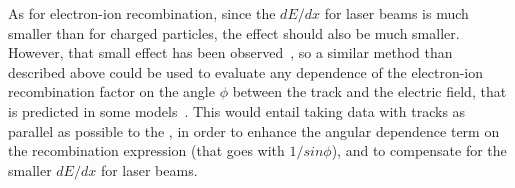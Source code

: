 As for electron-ion recombination, since the $dE/dx$ for laser beams is much smaller than for charged particles, the effect should also be much smaller. However, that small effect has been observed~\cite{Badhrees:2010zz}, so a similar method than described above could be used to evaluate any dependence of the electron-ion recombination factor on the angle $\phi$ between the track and the electric field, that is predicted in some models~\cite{Acciarri:2013met}. This would entail taking data with tracks as parallel as possible to the \efield, in order to enhance the angular dependence term on the recombination expression (that goes with $1/sin \phi$), and to compensate for the smaller $dE/dx$ for laser beams.



